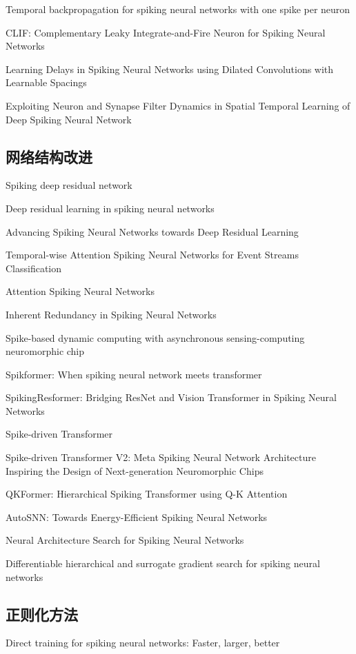 \documentclass{SCIS2020cn}
\begin{document}
Temporal backpropagation for spiking neural networks with one spike per neuron

CLIF: Complementary Leaky Integrate-and-Fire Neuron for Spiking Neural Networks


Learning Delays in Spiking Neural Networks using Dilated Convolutions with Learnable Spacings

Exploiting Neuron and Synapse Filter Dynamics in Spatial Temporal Learning of Deep Spiking Neural Network


\subsection{网络结构改进}%

Spiking deep residual network

Deep residual learning in spiking neural networks

Advancing Spiking Neural Networks towards Deep Residual Learning

Temporal-wise Attention Spiking Neural Networks for Event Streams Classification

Attention Spiking Neural Networks

Inherent Redundancy in Spiking Neural Networks

Spike-based dynamic computing with asynchronous sensing-computing neuromorphic chip

Spikformer: When spiking neural network meets transformer

SpikingResformer: Bridging ResNet and Vision Transformer in Spiking Neural Networks

Spike-driven Transformer

Spike-driven Transformer V2: Meta Spiking Neural Network Architecture Inspiring the Design of Next-generation Neuromorphic Chips

QKFormer: Hierarchical Spiking Transformer using Q-K Attention

AutoSNN: Towards Energy-Efficient Spiking Neural Networks

Neural Architecture Search for Spiking Neural Networks

Differentiable hierarchical and surrogate gradient
search for spiking neural networks

\subsection{正则化方法}%

Direct training for spiking neural networks: Faster, larger, better
\end{document}
